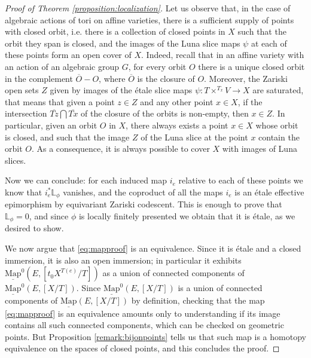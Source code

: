 \documentclass[11pt,letterpaper]{amsart}
\newcommand{\bL}{\mathbb{L}}
\newcommand{\Map}[2]{\underline{\mathrm{Map}}\left (#1,#2\right )}
\newcommand{\Mapo}[2]{\underline{\mathrm{Map}}^{0}\left (#1,#2\right )}
\begin{document}
\begin{proof}[Proof of Theorem  \ref{proposition:localization}]
Let us observe that, in the case of algebraic actions of tori on affine varieties, there is a sufficient supply of points with closed orbit, i.e. there is a collection of closed points in $X$ such that the orbit they span is closed, and the images of the Luna slice maps $\psi$ at each of these points form an open cover of $X$. 
Indeed, recall that in an affine variety with an action of an algebraic group $G$, for every orbit $O$ there is a unique closed orbit in the complement $\overline{O}-O$, where $\overline{O}$ is the closure of $O$.
Moreover, the Zariski open sets $Z$ given by images of the étale slice maps $\psi:T\times^{T_x}V\to X$ are saturated, that means that given a point $z\in Z$ and any other point $x\in X$, if the intersection $\overline{Tz}\bigcap\overline{Tx}$ of the closure of the orbits is non-empty, then $x\in Z$. In particular, given an orbit $O$ in $X$, there always exists a point $x\in X$ whose orbit is closed, and such that the image $Z$ of the Luna slice at the point $x$ contain the orbit $O$. As a consequence, it is always possible to cover $X$ with images of Luna slices.

Now we can conclude: for each induced map $i_e$ relative to each of these points we know that $i_e^\ast\bL_\phi$ vanishes, and the coproduct of all the maps $i_e$ is an étale effective epimorphism by equivariant Zariski codescent. This is enough to prove that $\bL_{\phi}=0$, and since $\phi$ is locally finitely presented we obtain that it is étale, as we desired to show.

We now argue that \eqref{eq:mapproof} is an equivalence.
Since it is étale and a closed immersion, it is also an open immersion; in particular it exhibits $\Mapo{E}{[t_0 X^{T(e)}/T]}$ as a union of connected components of $\Mapo{E}{[X/T]}$. Since $\Mapo{E}{[X/T]}$ is a union of connected components of $\Map{E}{[X/T]}$ by definition, checking that the map \eqref{eq:mapproof} is an equivalence amounts only to understanding if its image contains all such connected components, which can be checked on geometric points. But Proposition  \ref{remark:bijonpoints} tells us that such map is a homotopy equivalence on the spaces of closed points, and this concludes the proof.
\end{proof}
\end{document}
